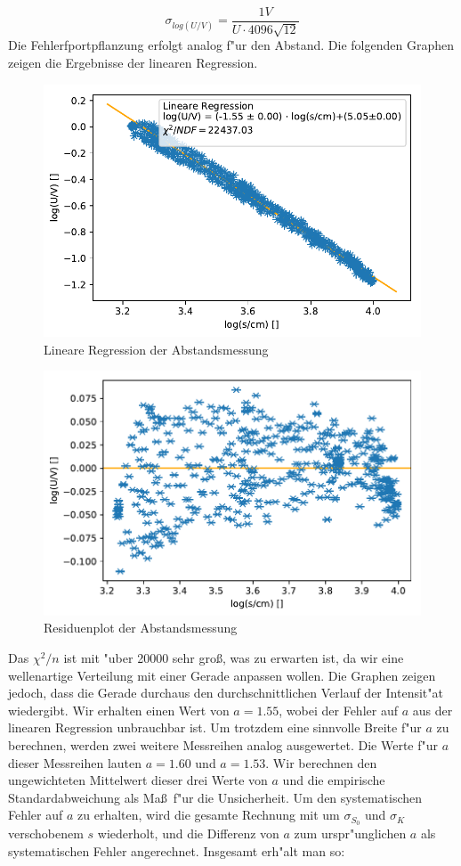 \documentclass[12pt,a4paper]{article}
\begin{document}
\begin{equation}
\sigma_{log(U/V)}=\frac{1V}{U\cdot4096\sqrt{12}}
\end{equation}
Die Fehlerfportpflanzung erfolgt analog f"ur den Abstand.
Die folgenden Graphen zeigen die Ergebnisse der linearen Regression.
\begin{figure}[H]
	\centering
	\includegraphics[scale=1]{Python/Abstand3_LinReg.pdf}
	\caption{Lineare Regression der Abstandsmessung}
\end{figure}
\begin{figure}[H]
	\centering
	\includegraphics[scale=1]{Python/Abstand3_Residuen.pdf}
	\caption{Residuenplot der Abstandsmessung}
	\label{Abstandsabh_Residuenplot}
\end{figure}
Das $\chi^2/n$ ist mit "uber 20000 sehr gro\ss, was zu erwarten ist, da wir eine wellenartige Verteilung mit einer Gerade anpassen wollen. Die Graphen zeigen jedoch, dass die Gerade durchaus den durchschnittlichen Verlauf der Intensit"at wiedergibt. Wir erhalten einen Wert von $a=1.55$, wobei der Fehler auf $a$ aus der linearen Regression unbrauchbar ist. Um trotzdem eine sinnvolle Breite f"ur $a$ zu berechnen, werden zwei weitere Messreihen analog ausgewertet. Die Werte f"ur $a$ dieser Messreihen lauten $a=1.60$ und $a=1.53$. Wir berechnen den ungewichteten Mittelwert dieser drei Werte von $a$ und die empirische Standardabweichung als Ma\ss\  f"ur die Unsicherheit. Um den systematischen Fehler auf $a$ zu erhalten, wird die gesamte Rechnung mit um $\sigma_{S_0}$ und $\sigma_{K}$ verschobenem $s$ wiederholt, und die Differenz von $a$ zum urspr"unglichen $a$ als systematischen Fehler angerechnet. Insgesamt erh"alt man so:
\end{document}
